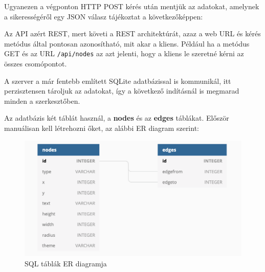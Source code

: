 
Ugyanezen a végponton HTTP POST kérés után mentjük az adatokat, amelynek a sikerességéről egy JSON válasz tájékoztat a következőképpen:

\begin{json}
\end{json}


Az API azért REST, mert követi a REST architektúrát, azaz a web URL és kérés metódus által pontosan azonosítható, mit akar a kliens. Például ha a metódus GET és az URL \texttt{/api/nodes} az azt jelenti, hogy a kliens le szeretné kérni az összes csomópontot.
 
A szerver a már fentebb említett SQLite adatbázissal is kommunikál, itt perzisztensen tároljuk az adatokat, így a következő indításnál is megmarad minden a szerkesztőben.

Az adatbázis két táblát használ, a \textbf{nodes} és az \textbf{edges} táblákat. Először manuálisan kell létrehozni őket, az alábbi ER diagram szerint:

\begin{figure}[h]
\centering
\includegraphics[scale=0.65]{images/sqltables.png}
\caption{SQL táblák ER diagramja}
\label{fig:sql}
\end{figure}

